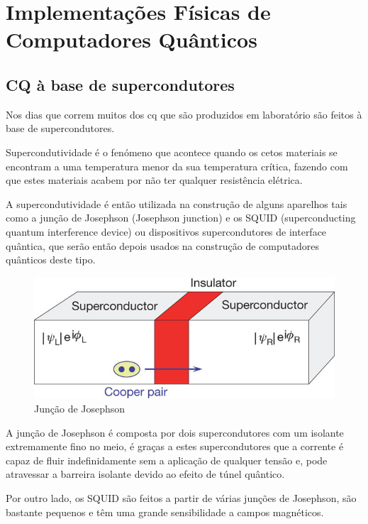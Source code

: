 \documentclass{report}
\begin{document}
\chapter{Implementações Físicas de Computadores Quânticos}
\label{chap.Implementações Físicas de Computadores Quânticos}

\section{CQ à base de supercondutores}
	Nos dias que correm muitos dos \ac{cq} que são produzidos em laboratório são feitos à base de supercondutores.

	Supercondutividade é o fenómeno que acontece quando os cetos materiais se encontram a uma temperatura menor da sua temperatura crítica, fazendo com que estes materiais acabem por não ter qualquer resistência elétrica.


	A supercondutividade é então utilizada na construção de alguns aparelhos tais como a junção de Josephson (Josephson junction) e os SQUID (superconducting quantum interference device) ou dispositivos supercondutores de interface quântica, que serão então depois usados na construção de computadores quânticos deste tipo.

\begin{figure}[!h]
	\centering
	\includegraphics[scale=0.5]{Josephson-junction.jpg}
	\caption{Junção de Josephson}
	\label{Junção de Josephson}
\end{figure}

\newpage

	A junção de Josephson  é composta por dois supercondutores com um isolante extremamente fino no meio, é graças a estes supercondutores que a corrente é capaz de fluir indefinidamente sem a aplicação de qualquer tensão e, pode atravessar a barreira isolante devido ao efeito de túnel quântico.

	Por outro lado, os SQUID são feitos a partir de várias junções de Josephson, são bastante pequenos e têm uma grande sensibilidade a campos magnéticos.
\end{document}
